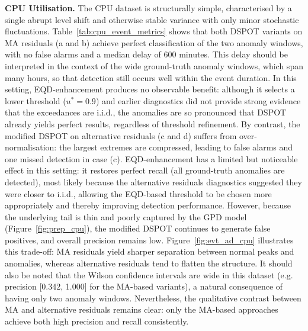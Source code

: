 \documentclass{statsmsc}
\begin{document}
\noindent\textbf{CPU Utilisation.} The CPU dataset is structurally simple, characterised by a single abrupt level shift 
and otherwise stable variance with only minor stochastic fluctuations. Table~\ref{tab:cpu_event_metrics} shows that both 
DSPOT variants on MA residuals (a and b) achieve perfect classification of the two anomaly windows, with no false alarms and 
a median delay of 600 minutes. This delay should be interpreted in the context of the wide ground-truth anomaly windows, 
which span many hours, so that detection still occurs well within the event duration. In this setting, EQD-enhancement produces
no observable benefit: although it selects a lower threshold ($u^*=0.9$) and earlier diagnostics did not provide strong evidence 
that the exceedances are i.i.d., the anomalies are so pronounced that DSPOT already yields perfect results, regardless of 
threshold refinement. By contrast, the modified DSPOT 
on alternative residuals (c and d) suffers from over-normalisation: the largest extremes are compressed, leading to false alarms
and one missed detection in case (c). EQD-enhancement has a limited but noticeable effect in this setting: it restores perfect
recall (all ground-truth anomalies are detected), most likely because the alternative residuals diagnostics suggested they 
were closer to i.i.d., allowing the EQD-based threshold to be chosen more appropriately and thereby improving detection performance. 
However, because the underlying tail is thin and poorly captured by the GPD model (Figure~\ref{fig:prep_cpu}), the modified
DSPOT continues to generate false positives, and overall precision remains low. Figure~\ref{fig:evt_ad_cpu} illustrates 
this trade-off: MA residuals yield sharper separation between normal peaks and anomalies, whereas alternative residuals tend to
flatten the structure. It should also be noted that the Wilson confidence intervals are wide in this dataset (e.g. precision
[0.342, 1.000] for the MA-based variants), a natural consequence of having only two anomaly windows. Nevertheless, the
qualitative contrast between MA and alternative residuals remains clear: only the MA-based approaches achieve both high 
precision and recall consistently.

\newcommand{\estci}[3]{%
  \begin{tabular}{@{}c@{}}%
    #1\\[-0.2ex]{\footnotesize[#2, #3]}%
  \end{tabular}%
}
\end{document}
